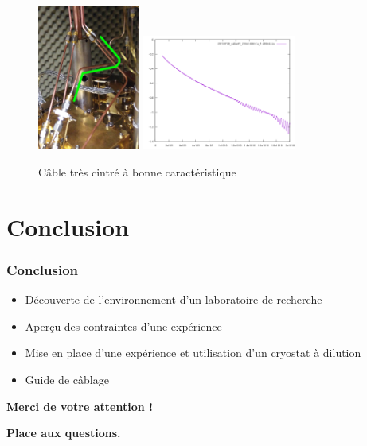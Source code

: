 \documentclass[10pt,a9paper,handout]{beamer} \usepackage[utf8]{inputenc} \usepackage[francais]{babel} \usepackage[T1]{fontenc}
\begin{document}
\begin{frame}
\begin{figure}[h]
    \centering
    \includegraphics[width=0.3\textwidth]{Images/Coax/Tres_cintre}
    \includegraphics[width=0.45\textwidth]{Images/Caracs/Tres_cintre}
    \caption{Câble très cintré à bonne caractéristique}
\end{figure}
\end{frame}

\section{Conclusion}
\begin{frame}
\frametitle{Conclusion}
\begin{itemize}
    \item Découverte de l'environnement d'un laboratoire de recherche
    \item Aperçu des contraintes d'une expérience
    \item Mise en place d'une expérience et utilisation d'un cryostat à dilution
    \item Guide de câblage
\end{itemize}
\vspace*{5mm}
\begin{figure}[h]
\end{figure}
\end{frame}

\begin{frame}
    \begin{LARGE}
    \begin{center}
    \textbf{Merci de votre attention !}
    \vspace{0.5cm}
    
    \textbf{Place aux questions.}
    \end{center}
    \end{LARGE}
\end{frame}
\end{document}
